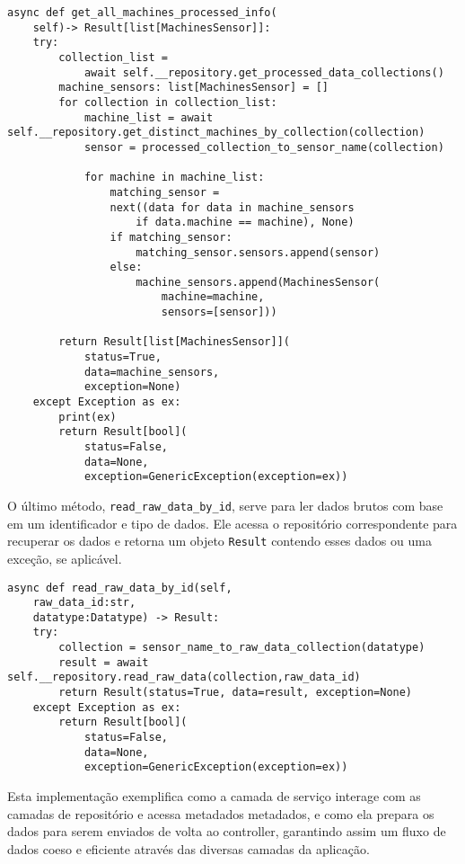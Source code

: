 \begin{verbatim}
async def get_all_machines_processed_info(
    self)-> Result[list[MachinesSensor]]:
    try:
        collection_list = 
            await self.__repository.get_processed_data_collections()
        machine_sensors: list[MachinesSensor] = []
        for collection in collection_list:
            machine_list = await self.__repository.get_distinct_machines_by_collection(collection)
            sensor = processed_collection_to_sensor_name(collection)

            for machine in machine_list:
                matching_sensor = 
                next((data for data in machine_sensors 
                    if data.machine == machine), None)
                if matching_sensor:
                    matching_sensor.sensors.append(sensor)
                else:
                    machine_sensors.append(MachinesSensor(
                        machine=machine,
                        sensors=[sensor]))
        
        return Result[list[MachinesSensor]](
            status=True,
            data=machine_sensors,
            exception=None)
    except Exception as ex:
        print(ex)
        return Result[bool](
            status=False,
            data=None,
            exception=GenericException(exception=ex)) 
\end{verbatim}

O último método, \texttt{read\_raw\_data\_by\_id}, serve para ler dados brutos com base em um identificador e tipo de dados. Ele acessa o repositório correspondente para recuperar os dados e retorna um objeto \texttt{Result} contendo esses dados ou uma exceção, se aplicável.
\begin{verbatim}
async def read_raw_data_by_id(self,
    raw_data_id:str,
    datatype:Datatype) -> Result:
    try:
        collection = sensor_name_to_raw_data_collection(datatype)
        result = await self.__repository.read_raw_data(collection,raw_data_id)
        return Result(status=True, data=result, exception=None) 
    except Exception as ex:
        return Result[bool](
            status=False,
            data=None,
            exception=GenericException(exception=ex)) 

\end{verbatim}
Esta implementação exemplifica como a camada de serviço interage com as camadas de repositório e acessa metadados metadados, e como ela prepara os dados para serem enviados de volta ao controller, garantindo assim um fluxo de dados coeso e eficiente através das diversas camadas da aplicação.

